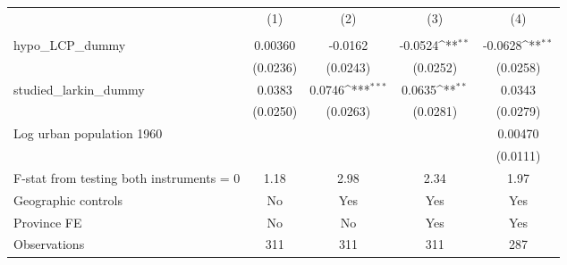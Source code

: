 {
\def\sym#1{\ifmmode^{#1}\else\(^{#1}\)\fi}
\begin{tabular}{l*{4}{c}}
\hline\hline
                &\multicolumn{1}{c}{(1)}&\multicolumn{1}{c}{(2)}&\multicolumn{1}{c}{(3)}&\multicolumn{1}{c}{(4)}\\
                &\multicolumn{1}{c}{}&\multicolumn{1}{c}{}&\multicolumn{1}{c}{}&\multicolumn{1}{c}{}\\
\hline
hypo\_LCP\_dummy  &  0.00360         &  -0.0162         &  -0.0524\sym{**} &  -0.0628\sym{**} \\
                & (0.0236)         & (0.0243)         & (0.0252)         & (0.0258)         \\
[1em]
studied\_larkin\_dummy&   0.0383         &   0.0746\sym{***}&   0.0635\sym{**} &   0.0343         \\
                & (0.0250)         & (0.0263)         & (0.0281)         & (0.0279)         \\
[1em]
Log urban population 1960&                  &                  &                  &  0.00470         \\
                &                  &                  &                  & (0.0111)         \\
\hline
F-stat from testing both instruments = 0&     1.18         &     2.98         &     2.34         &     1.97         \\
Geographic controls&       No         &      Yes         &      Yes         &      Yes         \\
Province FE     &       No         &       No         &      Yes         &      Yes         \\
Observations    &      311         &      311         &      311         &      287         \\
\hline\hline
\end{tabular}
}

